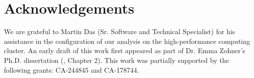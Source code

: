 \section*{Acknowledgements}
We are grateful to Martin Das (Sr. Software and Technical Specialist) for his assistance in the configuration of our analysis on the high-performance computing cluster. An early draft of this work first appeared as part of Dr. Emma Zohner's Ph.D. dissertation (\citeyear{zohner_feature_2021}, Chapter 2).
This work was partially supported by the following grants: CA-244845 and CA-178744.